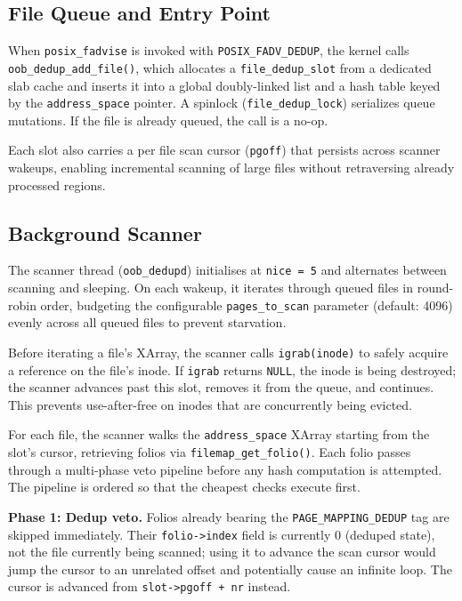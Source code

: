 \documentclass[conference]{IEEEtran}
\begin{document}
\subsection{File Queue and Entry Point}

When \texttt{posix\_fadvise} is invoked with \texttt{POSIX\_FADV\_DEDUP}, the kernel calls \texttt{oob\_dedup\_add\_file()}, which allocates a \texttt{file\_dedup\_slot} from a dedicated slab cache and inserts it into a global doubly-linked list and a hash table keyed by the \texttt{address\_space} pointer. A spinlock (\texttt{file\_dedup\_lock}) serializes queue mutations. If the file is already queued, the call is a no-op.

Each slot also carries a per file scan cursor (\texttt{pgoff}) that persists across scanner wakeups, enabling incremental scanning of large files without retraversing already processed regions.

\subsection{Background Scanner}

The scanner thread (\texttt{oob\_dedupd}) initialises at \texttt{nice = 5} and alternates between scanning and sleeping. On each wakeup, it iterates through queued files in round-robin order, budgeting the configurable \texttt{pages\_to\_scan} parameter (default: 4096) evenly across all queued files to prevent starvation.

Before iterating a file's XArray, the scanner calls \texttt{igrab(inode)} to safely acquire a reference on the file's inode. If \texttt{igrab} returns \texttt{NULL}, the inode is being destroyed; the scanner advances past this slot, removes it from the queue, and continues. This prevents use-after-free on inodes that are concurrently being evicted.

For each file, the scanner walks the \texttt{address\_space} XArray starting from the slot's cursor, retrieving folios via \texttt{filemap\_get\_folio()}. Each folio passes through a multi-phase veto pipeline before any hash computation is attempted. The pipeline is ordered so that the cheapest checks execute first.

\textbf{Phase 1: Dedup veto.} Folios already bearing the \texttt{PAGE\_MAPPING\_DEDUP} tag are skipped immediately. Their \texttt{folio->index} field is currently 0 (deduped state), not the file currently being scanned; using it to advance the scan cursor would jump the cursor to an unrelated offset and potentially cause an infinite loop. The cursor is advanced from \texttt{slot->pgoff + nr} instead.
\end{document}
